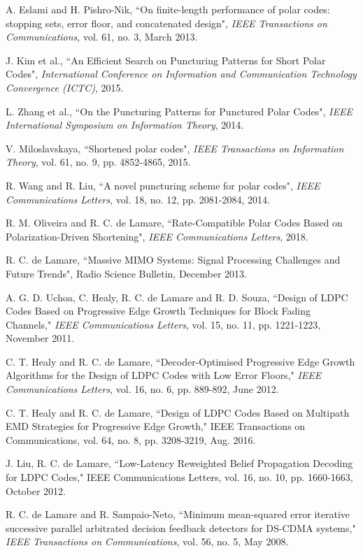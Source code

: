 \documentclass[10pt,twocolumn]{IEEEtran}
\begin{document}
\begin{thebibliography}{99}
A. Eslami and H. Pishro-Nik, ``On finite-length performance of polar
codes: stopping sets, error floor, and concatenated design",
\textit{IEEE Transactions on Communications}, vol. 61, no. 3, March
2013.

J. Kim et al., ``An Efficient Search on Puncturing Patterns for
Short Polar Codes", \textit{International Conference on Information
and Communication Technology Convergence (ICTC)}, 2015.

L. Zhang et al., ``On the Puncturing Patterns for Punctured Polar
Codes", \textit{IEEE International Symposium on Information Theory},
2014.

V. Miloslavskaya, ``Shortened polar codes", \textit{IEEE
Transactions on Information Theory}, vol. 61, no. 9, pp. 4852-4865,
2015.

R. Wang and R. Liu, ``A novel puncturing scheme for polar codes",
\textit{IEEE Communications Letters}, vol. 18, no. 12, pp.
2081-2084, 2014.

R. M. Oliveira and R. C. de Lamare, ``Rate-Compatible Polar Codes
Based on Polarization-Driven Shortening", \textit{IEEE
Communications Letters}, 2018.

R. C. de Lamare, ``Massive MIMO Systems: Signal Processing
Challenges and Future Trends", Radio Science Bulletin, December
2013.

A. G. D. Uchoa, C. Healy, R. C. de Lamare and R. D. Souza, ``Design
of LDPC Codes Based on Progressive Edge Growth Techniques for Block
Fading Channels," \textit{IEEE Communications Letters}, vol. 15, no.
11, pp. 1221-1223, November 2011.

C. T. Healy and R. C. de Lamare, ``Decoder-Optimised Progressive
Edge Growth Algorithms for the Design of LDPC Codes with Low Error
Floors," \textit{IEEE Communications Letters}, vol. 16, no. 6, pp.
889-892, June 2012.

C. T. Healy and R. C. de Lamare, ``Design of LDPC Codes Based on
Multipath EMD Strategies for Progressive Edge Growth," IEEE
Transactions on Communications, vol. 64, no. 8, pp. 3208-3219, Aug.
2016.

J. Liu, R. C. de Lamare, ``Low-Latency Reweighted Belief Propagation
Decoding for LDPC Codes," IEEE Communications Letters, vol. 16, no.
10, pp. 1660-1663, October 2012.

R. C. de Lamare and R. Sampaio-Neto, ``Minimum mean-squared error
iterative successive parallel arbitrated decision feedback detectors
for DS-CDMA systems," \textit{IEEE Transactions on Communications},
vol. 56, no. 5, May 2008.


\end{thebibliography}
\end{document}
